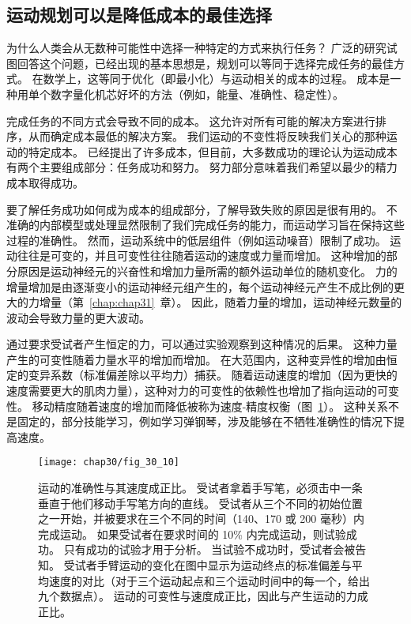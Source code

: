 \subsection{运动规划可以是降低成本的最佳选择}

为什么人类会从无数种可能性中选择一种特定的方式来执行任务？
广泛的研究试图回答这个问题，已经出现的基本思想是，规划可以等同于选择完成任务的最佳方式。
在数学上，这等同于优化（即最小化）与运动相关的成本的过程。
成本是一种用单个数字量化机芯好坏的方法（例如，能量、准确性、稳定性）。


完成任务的不同方式会导致不同的成本。
这允许对所有可能的解决方案进行排序，从而确定成本最低的解决方案。
我们运动的不变性将反映我们关心的那种运动的特定成本。
已经提出了许多成本，但目前，大多数成功的理论认为运动成本有两个主要组成部分：任务成功和努力。
努力部分意味着我们希望以最少的精力成本取得成功。


要了解任务成功如何成为成本的组成部分，了解导致失败的原因是很有用的。
不准确的内部模型或处理显然限制了我们完成任务的能力，而运动学习旨在保持这些过程的准确性。
然而，运动系统中的低层组件（例如运动噪音）限制了成功。
运动往往是可变的，并且可变性往往随着运动的速度或力量而增加。
这种增加的部分原因是运动神经元的兴奋性和增加力量所需的额外运动单位的随机变化。
力的增量增加是由逐渐变小的运动神经元组产生的，每个运动神经元产生不成比例的更大的力增量（第~\ref{chap:chap31}~章）。
因此，随着力量的增加，运动神经元数量的波动会导致力量的更大波动。


通过要求受试者产生恒定的力，可以通过实验观察到这种情况的后果。
这种力量产生的可变性随着力量水平的增加而增加。
在大范围内，这种变异性的增加由恒定的变异系数（标准偏差除以平均力）捕获。
随着运动速度的增加（因为更快的速度需要更大的肌肉力量），这种对力的可变性的依赖性也增加了指向运动的可变性。
移动精度随着速度的增加而降低被称为速度-精度权衡（图~\ref{fig:30_10}）。
这种关系不是固定的，部分技能学习，例如学习弹钢琴，涉及能够在不牺牲准确性的情况下提高速度。


\begin{figure}[htbp]
	\centering
	\texttt{[image: chap30/fig\_30\_10]}
	\caption{运动的准确性与其速度成正比。
		受试者拿着手写笔，必须击中一条垂直于他们移动手写笔方向的直线。
		受试者从三个不同的初始位置之一开始，并被要求在三个不同的时间（140、170 或 200 毫秒）内完成运动。
		如果受试者在要求时间的 10\% 内完成运动，则试验成功。
		只有成功的试验才用于分析。
		当试验不成功时，受试者会被告知。
		受试者手臂运动的变化在图中显示为运动终点的标准偏差与平均速度的对比（对于三个运动起点和三个运动时间中的每一个，给出九个数据点）。
		运动的可变性与速度成正比，因此与产生运动的力成正比\cite{schmidt1979motor}。}
	\label{fig:30_10}
\end{figure}


